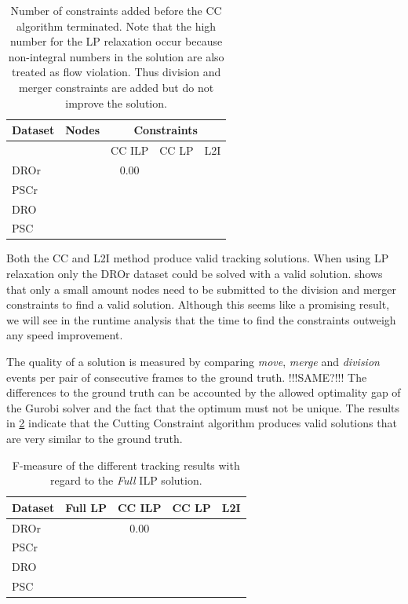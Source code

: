 \documentclass[10pt,twocolumn,letterpaper]{article}
\begin{document}
\begin{table}
  \begin{center}
  \begin{tabular}{|l|c||c|c|c|}
    \hline
    Dataset & Nodes & \multicolumn{3}{|c|}{Constraints}\\
    \hline\hline
            &       & CC ILP & CC LP & L2I\\
    \hline
    DROr & & 0.00 & & \\
    PSCr & & & &\\
    DRO & & & & \\
    PSC & & & & \\
    \hline
  \end{tabular}
  \end{center}
  \caption{Number of constraints added before the CC algorithm terminated. Note that the high number for the LP relaxation occur because non-integral numbers in the solution are also treated as flow violation. Thus division and merger constraints are added but do not improve the solution.}
  \label{tab:constraints}
\end{table}


Both the CC and L2I method produce valid tracking solutions. When using LP relaxation only the DROr dataset could be solved with a valid solution.  shows that only a small amount nodes need to be submitted to the division and merger constraints to find a valid solution. Although this seems like a promising result, we will see in the runtime analysis that the time to find the constraints outweigh any speed improvement.

The quality of a solution is measured by comparing \textit{move}, \textit{merge} and \textit{division} events per pair of consecutive frames to the ground truth. !!!SAME?!!! The differences to the ground truth can be accounted by the allowed optimality gap of the Gurobi solver and the fact that the optimum must not be unique. The results in \cref{tab:fmeasure} indicate that the Cutting Constraint algorithm produces valid solutions that are very similar to the ground truth.

\begin{table}
  \begin{center}
  \begin{tabular}{|l||c|c|c|c|}
    \hline
    Dataset & Full LP & CC ILP & CC LP & L2I\\
    \hline\hline
    DROr & & 0.00 & & \\
    PSCr & & & &\\
    DRO & & & & \\
    PSC & & & & \\
    \hline
  \end{tabular}
  \end{center}
  \caption{F-measure of the different tracking results with regard to the \textit{Full} ILP solution.}
  \label{tab:fmeasure}
\end{table}
\end{document}
